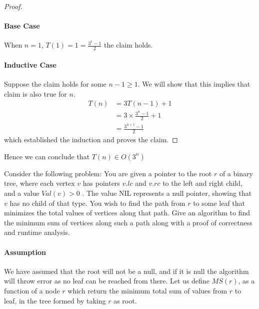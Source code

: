 \documentclass[answers]{exam}
\begin{document}
\begin{questions}
\begin{solution}
\begin{proof}
\paragraph{Base Case} When $n=1$, $T(1) = 1 = \frac{3^1 - 1}{2}$ the claim holds.
\paragraph{Inductive Case} Suppose the claim holds for some $n-1 \geq 1$. We will show that this implies that claim is also true for $n$.
\begin{align*}
    T(n) &= 3T(n-1) + 1\\
         &= 3 \times \frac{3^n - 1}{2} + 1\\
         &= \frac{3^{n+1} - 1}{2}
\end{align*}
which established the induction and proves the claim.
\end{proof}
Hence we can conclude that $T(n) \in O(3^n)$
\end{solution}



\vspace{0.3in}






\question[20]
Consider the following problem:  You are given a pointer to the root $r$ of a binary tree, where each vertex $v$
has pointers $v.lc$ and $v.rc$ to the left and right child, and a value $Val(v) > 0$ .  The value NIL represents
a null pointer, showing that $v$ has no child of that type.
You wish to find the path from $r$ to some leaf that minimizes the total values of vertices along that path. Give an algorithm to find the minimum sum of vertices along such a path along with a proof of correctness and runtime analysis.

\begin{solution}

\paragraph{Assumption} We have assumed that the root will not be a null, and if it is null the algorithm will throw error as no leaf can be reached from there.
Let us define $MS(r)$, as a function of a node $r$ which return the minimum total sum of values from $r$ to leaf, in the tree formed by taking $r$ as root. 



\end{solution}
\end{questions}
\end{document}
